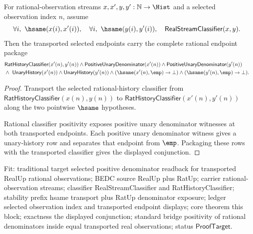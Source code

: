 \begin{theorem}
\label{thm:real-stream-classifier-transport-selected-positive-unary-nonempty-package}
For rational-observation streams $x,x',y,y':\mathbb{N}\to\Hist$ and a selected
observation index $n$, assume
$$
\forall i,\ \hsame(x(i),x'(i)),\quad
\forall i,\ \hsame(y(i),y'(i)),\quad
\mathsf{RealStreamClassifier}(x,y).
$$
Then the transported selected endpoints carry the complete rational endpoint
package
$$
\begin{aligned}
&\mathsf{RatHistoryClassifier}(x'(n),y'(n))\land
\mathsf{PositiveUnaryDenominator}(x'(n))\land
\mathsf{PositiveUnaryDenominator}(y'(n))\\
&\land\ \mathsf{UnaryHistory}(x'(n))\land
\mathsf{UnaryHistory}(y'(n))\land
(\hsame(x'(n),\emp)\to\bot)\land
(\hsame(y'(n),\emp)\to\bot).
\end{aligned}
$$
\end{theorem}
\begin{proof}
Transport the selected rational-history classifier from
$\mathsf{RatHistoryClassifier}(x(n),y(n))$ to
$\mathsf{RatHistoryClassifier}(x'(n),y'(n))$ along the two pointwise
$\hsame$ hypotheses.

Rational classifier positivity exposes positive unary denominator witnesses at
both transported endpoints. Each positive unary denominator witness gives a
unary-history row and separates that endpoint from $\emp$. Packaging these rows
with the transported classifier gives the displayed conjunction.
\end{proof}

Fit: traditional target selected positive denominator readback for transported
RealUp rational observations; BEDC source RealUp plus RatUp; carrier
rational-observation streams; classifier RealStreamClassifier and
RatHistoryClassifier; stability prefix hsame transport plus RatUp denominator
exposure; ledger selected observation index and transported endpoint displays;
core theorem this block; exactness the displayed conjunction; standard bridge
positivity of rational denominators inside equal transported real observations;
status $\mathsf{ProofTarget}$.

